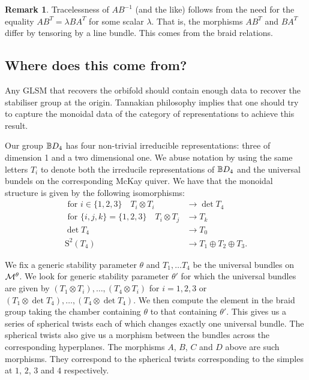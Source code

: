 \documentclass{amsart}
\theoremstyle{definition}
\newtheorem{rmk}[thm]{Remark}
\begin{document}
\begin{rmk}
Tracelessness of $AB^{-1}$ (and the like) follows from the need for  the equality $AB^{T}= \lambda BA^{T}$ for some scalar $\lambda$. That is, the morphisms $AB^{T}$ and $BA^{T}$ differ by tensoring by a line bundle. This comes from the braid relations.
\end{rmk}

\subsection*{Where does this come from?}

Any GLSM that recovers the orbifold should contain enough data to recover the stabiliser group at the origin. 
Tannakian philosophy implies that one should try to capture the monoidal data of the category of representations to achieve this result.

Our group $\mathbb{B} D_4$ has four non-trivial irreducible representations: three of dimension 1 and a two dimensional one. We abuse notation by using the same letters $T_i$ to denote both the irreducile representations of $\mathbb{B} D_4$ and the universal bundels on the corresponding McKay quiver.
We have that the monoidal structure is given by the following isomorphisms:
\begin{align*}
\text{ for } i \in \{1,2,3\} \quad T_i \otimes T_i &\rightarrow \det T_4 \\
\text{ for } \{i,j,k\} = \{1,2,3\} \quad T_i \otimes T_j &\rightarrow T_k\\
\det T_4  &\rightarrow T_0 \\
\text{S}^2(T_4) &\rightarrow T_1 \oplus T_2 \oplus T_3.
\end{align*}

We fix a generic stability parameter $\theta$ and $T_1, \ldots T_4$ be the universal bundles on $\mathcal{M}^\theta$.
We look for generic stability parameter $\theta'$ for which the universal bundles are given by $(T_1 \otimes T_i), \ldots, (T_4 \otimes T_i)$ for $i = 1,2,3$ or $(T_1 \otimes \det T_4), \ldots, (T_4 \otimes \det T_4)$.
We then compute the element in the braid group taking the chamber containing $\theta$ to that containing $\theta'$.
This gives us a series of spherical twists each of which changes exactly one universal bundle.
The spherical twists also give us a morphism between the bundles across the corresponding hyperplanes.
The morphisms $A$, $B$, $C$ and $D$ above are such morphisms.
They correspond to the spherical twists corresponding to the simples at $1$, $2$, $3$ and $4$ respectively.
\end{document}
